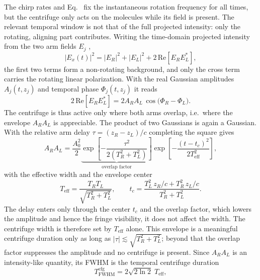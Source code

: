 The chirp rates and Eq.~ fix the instantaneous rotation frequency for all times, but the centrifuge only acts on the molecules while its field is present. The relevant temporal window is not that of the full projected intensity: only the rotating, aligning part contributes. Writing the time-domain projected intensity from the two arm fields $E_j$ ,
\begin{equation}
    |E_x(t)|^2 = |E_R|^2+|E_L|^2 +2\,\mathrm{Re}\!\left[E_R E_L^*\right],
    \label{eq:projected_intensity_time}
\end{equation}
the first two terms form a non-rotating background, and only the cross term carries the rotating linear polarization. With the real Gaussian amplitudes $A_j(t,z_j)$  and temporal phase $\Phi_j(t,z_j)$  it reads
\begin{equation}
    2\,\mathrm{Re}\!\left[E_R E_L^*\right] = 2A_R A_L\,\cos\!\big(\Phi_R-\Phi_L\big).
    \label{eq:cross_term_time}
\end{equation}
The centrifuge is thus active only where both arms overlap, i.e.\ where the envelope $A_R A_L$ is appreciable.
The product of two Gaussians is again a Gaussian. With the relative arm delay $\tau=(z_R-z_L)/c$ completing the square gives
\begin{equation}
    A_R A_L = \frac{A_0^2}{2} \underbrace{\exp\!\left[-\frac{\tau^2}{2\left(T_R^2+T_L^2\right)}\right]}_{\text{overlap factor}} \exp\!\left[-\frac{(t-t_c)^2}{2T_\mathrm{eff}^2}\right],
    \label{eq:gaussian_product}
\end{equation}
with the effective width and the envelope center
\begin{equation}
    T_\mathrm{eff}=\frac{T_R T_L}{\sqrt{T_R^2+T_L^2}}, \qquad t_c=\frac{T_L^2\,z_R/c+T_R^2\,z_L/c}{T_R^2+T_L^2}.
    \label{eq:teff_tc}
\end{equation}
The delay enters only through the center $t_c$ and the overlap factor, which lowers the amplitude and hence the fringe visibility, it does not affect the width. The centrifuge width is therefore set by $T_\mathrm{eff}$ alone. This envelope is a meaningful centrifuge duration only as long as $|\tau|\lesssim\sqrt{T_R^2+T_L^2}$; beyond that the overlap factor suppresses the amplitude and no centrifuge is present.
Since $A_R A_L$ is an intensity-like quantity, its FWHM is the temporal centrifuge duration
\begin{equation}
    T_\mathrm{FWHM}^\mathrm{cfg} = 2\sqrt{2\ln 2}\;T_\mathrm{eff},
    \label{eq:centrifuge_duration}
\end{equation}
